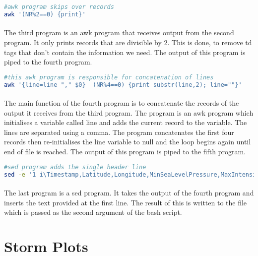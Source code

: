 \documentclass[]{article}
\begin{document}
\begin{lstlisting}[language=Bash, caption = Third program]
#awk program skips over records
awk '(NR%2==0) {print}'
\end{lstlisting}
\paragraph{}The third program is an awk program that receives output from the second program. It only prints records that are divisible by 2. This is done, to remove td tags that don't contain the information we need. The output of this program is piped to the fourth program.

\begin{lstlisting}[language=Bash, caption = Fourth program]
#this awk program is responsible for concatenation of lines
awk '{line=line "," $0}  (NR%4==0) {print substr(line,2); line=""}' 
\end{lstlisting}
\paragraph{}The main function of the fourth program is to concatenate the records of the output it receives from the third program. The program is an awk program which initialises a variable called line and adds the current record to the variable. The lines are separated using a comma. The program concatenates the first four records then re-initialises the line variable to null and the loop begins again until end of file is reached. The output of this program is piped to the fifth program.

\begin{lstlisting}[language=Bash, caption = Fifth program]
#sed program adds the single header line
sed -e '1 i\Timestamp,Latitude,Longitude,MinSeaLevelPressure,MaxIntensity' > "$2"
\end{lstlisting}
\paragraph{}The last program is a sed program. It takes the output of the fourth program and inserts the text provided at the first line. The result of this is written to the file which is passed as the second argument of the bash script.


\section{Storm Plots}
\end{document}
